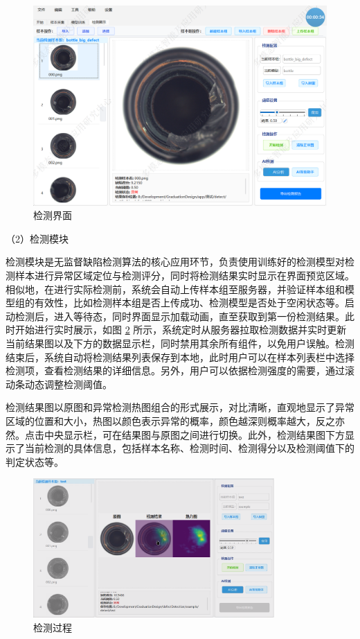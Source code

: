 \documentclass[
  ]{njuthesis}
\begin{document}
\begin{figure}[htb]
    \centering
    \includegraphics[width=\textwidth]{images/检测界面.png}
    \caption{检测界面}
    \label{检测界面}
\end{figure}

（2）检测模块

检测模块是无监督缺陷检测算法的核心应用环节，负责使用训练好的检测模型对检测样本进行异常区域定位与检测评分，同时将检测结果实时显示在界面预览区域。相似地，在进行实际检测前，系统会自动上传样本组至服务器，并验证样本组和模型组的有效性，比如检测样本组是否上传成功、检测模型是否处于空闲状态等。启动检测后，进入等待态，同时界面显示加载动画，直至获取到第一份检测结果。此时开始进行实时展示，如图 \ref{检测过程} 所示，系统定时从服务器拉取检测数据并实时更新当前结果图以及下方的数据显示栏，同时禁用其余所有组件，以免用户误触。检测结束后，系统自动将检测结果列表保存到本地，此时用户可以在样本列表栏中选择检测项，查看检测结果的详细信息。另外，用户可以依据检测强度的需要，通过滚动条动态调整检测阈值。

检测结果图以原图和异常检测热图组合的形式展示，对比清晰，直观地显示了异常区域的位置和大小，热图以颜色表示异常的概率，颜色越深则概率越大，反之亦然。点击中央显示栏，可在结果图与原图之间进行切换。此外，检测结果图下方显示了当前检测的具体信息，包括样本名称、检测时间、检测得分以及检测阈值下的判定状态等。

\begin{figure}[htb]
    \centering
    \includegraphics[width=0.82\textwidth]{images/检测过程.png}
    \caption{检测过程}
    \label{检测过程}
\end{figure}
\end{document}

